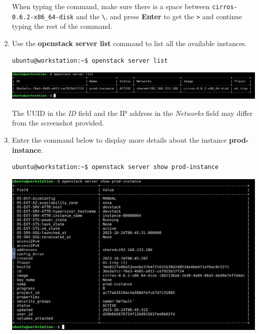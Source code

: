 \documentclass[letterpaper, 12pt]{article}
\begin{document}
\begin{enumerate}
    \begin{tipbox}{}
        When typing the command, make sure there is a space between \texttt{cirros-0.6.2-x86\_64-disk} and the
        \texttt{\textbackslash}, and press \textbf{Enter} to get the \texttt{>} and continue typing the rest of the
        command.
    \end{tipbox}

    \item Use the \textbf{openstack server list} command to list all the available instances.
\begin{lstlisting}
ubuntu@workstation:~$ openstack server list
\end{lstlisting}

    \begin{center}
        \includegraphics[width=\linewidth]{images/part_2_step_13.png}
    \end{center}

    \begin{notebox}{}
        The UUID in the \textit{ID} field and the IP address in the \textit{Networks} field may differ from the
        screenshot provided.
    \end{notebox}

    \item Enter the command below to display more details about the instance \textbf{prod-instance}.
\begin{lstlisting}
ubuntu@workstation:~$ openstack server show prod-instance
\end{lstlisting}

    \begin{center}
        \includegraphics[width=\linewidth]{images/part_2_step_14.png}
    \end{center}


\end{enumerate}
\end{document}
